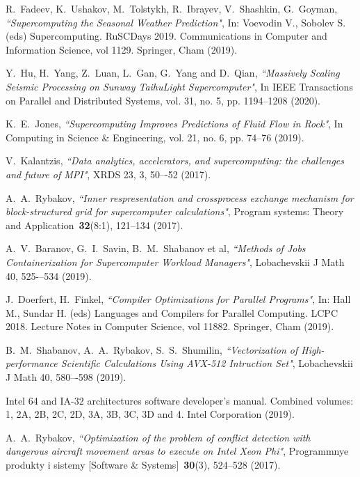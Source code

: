 \documentclass[
11pt,%
tightenlines,%
twoside,%
onecolumn,%
nofloats,%
nobibnotes,%
nofootinbib,%
superscriptaddress,%
noshowpacs,%
centertags]%
{revtex4}
\begin{document}
\begin{thebibliography}{99}

R.~Fadeev, K.~Ushakov, M.~Tolstykh, R.~Ibrayev, V.~Shashkin, G.~Goyman, {\it ``Supercomputing the Seasonal Weather Prediction"}, In: Voevodin V., Sobolev S. (eds) Supercomputing. RuSCDays 2019. Communications in Computer and Information Science, vol 1129. Springer, Cham (2019).

Y.~Hu, H.~Yang, Z.~Luan, L.~Gan, G.~Yang and D.~Qian, {\it ``Massively Scaling Seismic Processing on Sunway TaihuLight Supercomputer"}, In IEEE Transactions on Parallel and Distributed Systems, vol. 31, no. 5, pp. 1194--1208 (2020).

K.~E.~Jones, {\it ``Supercomputing Improves Predictions of Fluid Flow in Rock"}, In Computing in Science \& Engineering, vol. 21, no. 6, pp. 74--76 (2019).

V.~Kalantzis, {\it ``Data analytics, accelerators, and supercomputing: the challenges and future of MPI"}, XRDS 23, 3, 50–-52 (2017).

A.~A.~Rybakov, {\it ``Inner respresentation and crossprocess exchange mechanism for block-structured grid for supercomputer calculations"}, Program systems: Theory and Application~{\bf 32}(8:1), 121--134 (2017).

A.~V.~Baranov, G.~I.~Savin, B.~M.~Shabanov et al, {\it ``Methods of Jobs Containerization for Supercomputer Workload Managers"}, Lobachevskii J Math 40, 525-–534 (2019).

J.~Doerfert, H.~Finkel, {\it ``Compiler Optimizations for Parallel Programs"}, In: Hall M., Sundar H. (eds) Languages and Compilers for Parallel Computing. LCPC 2018. Lecture Notes in Computer Science, vol 11882. Springer, Cham (2019).

B.~M.~Shabanov, A.~A.~Rybakov, S.~S.~Shumilin, {\it ``Vectorization of High-performance Scientific Calculations Using AVX-512 Intruction Set"}, Lobachevskii J Math 40, 580–-598 (2019).

Intel 64 and IA-32 architectures software developer's manual. Combined volumes: 1, 2A, 2B, 2C, 2D, 3A, 3B, 3C, 3D and 4. Intel Corporation (2019).

A.~A.~Rybakov, {\it ``Optimization of the problem of conflict detection with dangerous aircraft movement areas to execute on Intel Xeon Phi"}, Programmnye produkty i sistemy [Software \& Systems]~{\bf 30}(3), 524--528 (2017).


\end{thebibliography}
\end{document}
